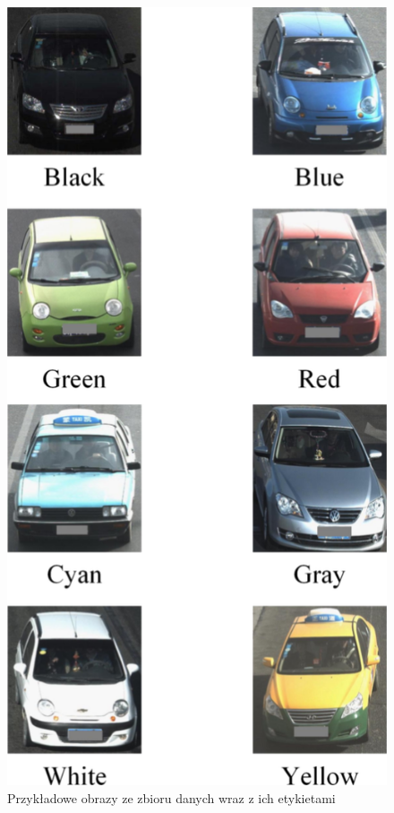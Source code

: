 \begin{figure}[h!]
    \begin{center}
        \includegraphics[scale=0.73]{img/dataset.png}        
    \end{center}
    \caption{Przykładowe obrazy ze zbioru danych wraz z ich etykietami}
    \label{fig:przykładowe obrazy}
\end{figure}

